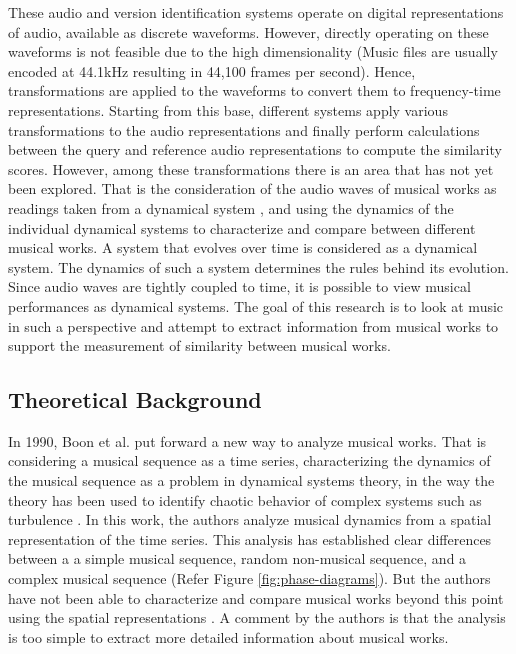 \documentclass[../main.tex]{subfiles}
\begin{document}
\par
These audio and version identification systems operate on digital representations of audio, available as discrete waveforms. However, directly operating on these waveforms is not feasible due to the high dimensionality (Music files are usually encoded at 44.1kHz resulting in 44,100 frames per second). Hence, transformations are applied to the waveforms to convert them to frequency-time representations. Starting from this base, different systems apply various transformations to the audio representations  and finally perform calculations between the query and reference audio representations to compute the similarity scores. However, among these transformations there is an area that has not yet been explored. That is the consideration of the audio waves of musical works as readings taken from a dynamical system \cite{complex_dynamics}, and using the dynamics of the individual dynamical systems to characterize and compare between different musical works. A system that evolves over time is considered as a dynamical system. The dynamics of such a system determines the rules behind its evolution. Since audio waves are tightly coupled to time, it is possible to view musical performances as dynamical systems. The goal of this research is to look at music in such a perspective and attempt to extract information from musical works to support the measurement of similarity between musical works.



\subsection{Theoretical Background}

\par
In 1990, Boon et al. put forward a new way to analyze musical works. That is considering a musical sequence as a time series, characterizing the dynamics of the musical sequence as a problem in dynamical systems theory, in the way the theory has been used to identify chaotic behavior of complex systems such as turbulence \cite{complex_dynamics}. In this work, the authors analyze musical dynamics from a spatial representation of the time series. This analysis has established clear differences between a a simple musical sequence, random non-musical sequence, and a complex musical sequence (Refer Figure \ref{fig:phase-diagrams}). But the authors have not been able to characterize and compare musical works beyond this point using the spatial representations \cite{boonDynamicalSystemsTheory1995}. A comment by the authors is that the analysis is too simple to extract more detailed information about musical works.
\end{document}

